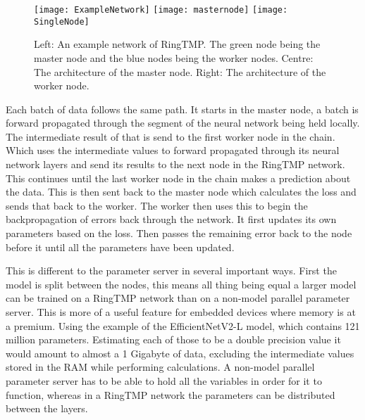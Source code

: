 \begin{figure}[h]
    \texttt{[image: ExampleNetwork]}
    \texttt{[image: masternode]}
    \texttt{[image: SingleNode]}
    \caption{Left: An example network of RingTMP. The green node being the
            master node and the blue nodes being the worker nodes. Centre: The
            architecture of the master node. Right: The architecture of the
            worker node.}
\end{figure}

Each batch of data follows the same path. It starts in the master node, a batch
is forward propagated through the segment of the neural network being held
locally. The intermediate result of that is send to the first worker node in the
chain. Which uses the intermediate values to forward propagated through its
neural network layers and send its results to the next node in the RingTMP
network. This continues until the last worker node in the chain makes a
prediction about the data. This is then sent back to the master node which
calculates the loss and sends that back to the worker. The worker then uses this
to begin the backpropagation of errors back through the network. It first
updates its own parameters based on the loss. Then passes the remaining
error back to the node before it until all the parameters have been updated.

This is different to the parameter server in several important ways. First the
model is split between the nodes, this means all thing being equal a larger
model can be trained on a RingTMP network than on a non-model parallel parameter
server. This is more of a useful feature for embedded devices where memory is at
a premium. Using the example of the EfficientNetV2-L model, which contains 121
million parameters. \cite{tan2021efficientnetv2} Estimating each of those to be
a double precision value it would amount to almost a 1 Gigabyte of data,
excluding the intermediate values stored in the RAM while performing
calculations. A non-model parallel parameter server has to be able to hold all
the variables in order for it to function, whereas in a RingTMP network the
parameters can be distributed between the layers.

